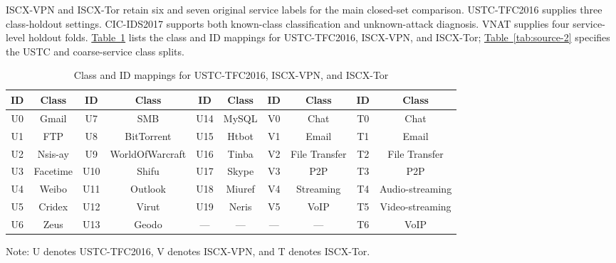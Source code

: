 ISCX-VPN and ISCX-Tor retain six and seven original service labels for the main closed-set comparison. USTC-TFC2016 supplies three class-holdout settings. CIC-IDS2017 supports both known-class classification and unknown-attack diagnosis. VNAT supplies four service-level holdout folds. \hyperref[tab:source-1]{Table~\ref*{tab:source-1}} lists the class and ID mappings for USTC-TFC2016, ISCX-VPN, and ISCX-Tor; \hyperref[tab:source-2]{Table~\ref*{tab:source-2}} specifies the USTC and coarse-service class splits.

\begin{table}[!t]
\centering
\begingroup
\renewcommand{\thetable}{4-1}
\caption{Class and ID mappings for USTC-TFC2016, ISCX-VPN, and ISCX-Tor}\label{tab:source-1}
\fontsize{8}{9.5}\selectfont
\setlength{\tabcolsep}{3pt}
\begin{tabular*}{\textwidth}{@{\extracolsep{\fill}}*{10}{c}@{}}
\hline
ID & Class & ID & Class & ID & Class & ID & Class & ID & Class \\
\hline
U0 & Gmail & U7 & SMB & U14 & MySQL & V0 & Chat & T0 & Chat \\
U1 & FTP & U8 & BitTorrent & U15 & Htbot & V1 & Email & T1 & Email \\
U2 & Nsis-ay & U9 & WorldOfWarcraft & U16 & Tinba & V2 & File Transfer & T2 & File Transfer \\
U3 & Facetime & U10 & Shifu & U17 & Skype & V3 & P2P & T3 & P2P \\
U4 & Weibo & U11 & Outlook & U18 & Miuref & V4 & Streaming & T4 & Audio-streaming \\
U5 & Cridex & U12 & Virut & U19 & Neris & V5 & VoIP & T5 & Video-streaming \\
U6 & Zeus & U13 & Geodo & --- & --- & --- & --- & T6 & VoIP \\
\hline
\end{tabular*}
\par\smallskip\parbox{\textwidth}{\fontsize{7}{8}\selectfont Note: U denotes USTC-TFC2016, V denotes ISCX-VPN, and T denotes ISCX-Tor.}
\endgroup
\end{table}

\begin{table}[!t]
\centering
\begingroup
\renewcommand{\thetable}{4-2}
\caption{Experimental scenarios and known/unknown class splits}\label{tab:source-2}
\footnotesize
\setlength{\tabcolsep}{4pt}
\endgroup
\end{table}


